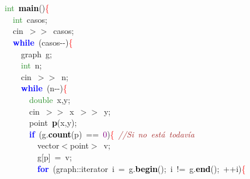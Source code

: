 \mbox{} \\
\mbox{} \\
\mbox{}\textcolor{ForestGreen}{int}\ \textbf{\textcolor{Black}{main}}\textcolor{BrickRed}{()}\textcolor{Red}{\{} \\
\mbox{}\ \ \textcolor{ForestGreen}{int}\ casos\textcolor{BrickRed}{;} \\
\mbox{}\ \ cin\ \textcolor{BrickRed}{$>$$>$}\ casos\textcolor{BrickRed}{;} \\
\mbox{}\ \ \textbf{\textcolor{Blue}{while}}\ \textcolor{BrickRed}{(}casos\textcolor{BrickRed}{-\/-)}\textcolor{Red}{\{} \\
\mbox{}\ \ \ \ graph\ g\textcolor{BrickRed}{;} \\
\mbox{}\ \ \ \ \textcolor{ForestGreen}{int}\ n\textcolor{BrickRed}{;} \\
\mbox{}\ \ \ \ cin\ \textcolor{BrickRed}{$>$$>$}\ n\textcolor{BrickRed}{;} \\
\mbox{}\ \ \ \ \textbf{\textcolor{Blue}{while}}\ \textcolor{BrickRed}{(}n\textcolor{BrickRed}{-\/-)}\textcolor{Red}{\{} \\
\mbox{}\ \ \ \ \ \ \textcolor{ForestGreen}{double}\ x\textcolor{BrickRed}{,}y\textcolor{BrickRed}{;} \\
\mbox{}\ \ \ \ \ \ cin\ \textcolor{BrickRed}{$>$$>$}\ x\ \textcolor{BrickRed}{$>$$>$}\ y\textcolor{BrickRed}{;} \\
\mbox{}\ \ \ \ \ \ point\ \textbf{\textcolor{Black}{p}}\textcolor{BrickRed}{(}x\textcolor{BrickRed}{,}y\textcolor{BrickRed}{);} \\
\mbox{}\ \ \ \ \ \ \textbf{\textcolor{Blue}{if}}\ \textcolor{BrickRed}{(}g\textcolor{BrickRed}{.}\textbf{\textcolor{Black}{count}}\textcolor{BrickRed}{(}p\textcolor{BrickRed}{)}\ \textcolor{BrickRed}{==}\ \textcolor{Purple}{0}\textcolor{BrickRed}{)}\textcolor{Red}{\{}\ \textit{\textcolor{Brown}{//Si\ no\ está\ todavía}} \\
\mbox{}\ \ \ \ \ \ \ \ vector\textcolor{BrickRed}{$<$}point\textcolor{BrickRed}{$>$}\ v\textcolor{BrickRed}{;} \\
\mbox{}\ \ \ \ \ \ \ \ g\textcolor{BrickRed}{[}p\textcolor{BrickRed}{]}\ \textcolor{BrickRed}{=}\ v\textcolor{BrickRed}{;} \\
\mbox{}\ \ \ \ \ \ \ \ \textbf{\textcolor{Blue}{for}}\ \textcolor{BrickRed}{(}graph\textcolor{BrickRed}{::}iterator\ i\ \textcolor{BrickRed}{=}\ g\textcolor{BrickRed}{.}\textbf{\textcolor{Black}{begin}}\textcolor{BrickRed}{();}\ i\ \textcolor{BrickRed}{!=}\ g\textcolor{BrickRed}{.}\textbf{\textcolor{Black}{end}}\textcolor{BrickRed}{();}\ \textcolor{BrickRed}{++}i\textcolor{BrickRed}{)}\textcolor{Red}{\{} \\
